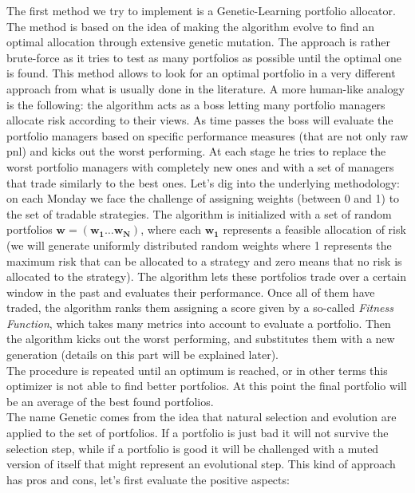 The first method we try to implement is a Genetic-Learning portfolio allocator. The method is based on the idea of making the algorithm evolve to find an optimal allocation through extensive genetic mutation.  The approach is rather brute-force as it tries to test as many portfolios as possible until the optimal one is found. This method allows to look for an optimal portfolio in a very different approach from what is usually done in the literature. A more human-like analogy is the following: the algorithm acts as a boss letting many portfolio managers allocate risk according to their views. As time passes the boss will evaluate the portfolio managers based on specific performance measures (that are not only raw pnl) and kicks out the worst performing. At each stage he tries to replace the worst portfolio managers with completely new ones and with a set of managers that trade similarly to the best ones. Let's dig into the underlying methodology: on each Monday we face the challenge of assigning weights (between 0 and 1) to the set of tradable strategies. The algorithm is initialized  with a set of random portfolios $\mathbf{w} = (\mathbf{w_1} \dots \mathbf{w_N})$, where each $\mathbf{w_1}$ represents a feasible allocation of risk (we will generate uniformly distributed random weights where 1 represents the maximum risk that can be allocated to a strategy and zero means that no risk is allocated to the strategy). The algorithm lets these portfolios trade over a certain window in the past and evaluates their performance. Once all of them have traded, the algorithm ranks them assigning a score given by a so-called \textit{Fitness Function}, which takes many metrics into account to evaluate a portfolio. Then the algorithm kicks out the worst performing, and substitutes them with a new generation (details on this part will be explained later).\\ 
The procedure is repeated until an optimum is reached, or in other terms this optimizer is not able to find better portfolios. At this point the final portfolio will be an average of the best found portfolios.\\
The name Genetic comes from the idea that natural selection and evolution are applied to the set of portfolios. If a portfolio is just bad it will not survive the selection step, while if a portfolio is good it will be challenged with a muted version of itself that might represent an evolutional step. This kind of approach has pros and cons, let's first evaluate the positive aspects:
